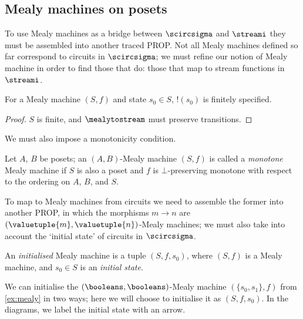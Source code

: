\documentclass{lmcs}
\begin{document}
\subsection{Mealy machines on posets}

To use Mealy machines as a bridge between \(\scircsigma\) and \(\streami\) they
must be assembled into another traced PROP.
Not all Mealy machines defined so far correspond to circuits in
\(\scircsigma\); we must refine our notion of Mealy machine in order to find
those that do: those that map to stream functions in \(\streami\).

\begin{lem}
    For a Mealy machine \((S, f)\) and state \(s_0 \in S\), \(!(s_0)\)
    is finitely specified.
\end{lem}
\begin{proof}
    \(S\) is finite, and \(\mealytostream\) must preserve transitions.
\end{proof}

We must also impose a monotonicity condition.

\begin{defi}
    Let \(A\), \(B\) be posets; an \((A,B)\)-Mealy machine \((S, f)\)
    is called a \emph{monotone} Mealy machine if \(S\) is also a poset and
    \(f\) is \(\bot\)-preserving monotone with respect to the ordering on
    \(A\), \(B\), and \(S\).
\end{defi}

To map to Mealy machines from circuits we need to assemble the former into
another PROP, in which the morphisms \(m \to n\) are
\((\valuetuple{m},\valuetuple{n})\)-Mealy machines; we must also take into
account the `initial state' of circuits in \(\scircsigma\).

\begin{defi}
    An \emph{initialised} Mealy machine is a tuple \((S, f, s_0)\), where
    \((S, f)\) is a Mealy machine, and \(s_0 \in S\) is an \emph{initial state}.
\end{defi}

\begin{exa}\label{ex:mealy-init}
    We can initialise the \((\booleans,\booleans)\)-Mealy machine
    \((\{s_0,s_1\},f)\) from \autoref{ex:mealy} in two ways; here we will choose to
    initialise it as \((S,f,s_0)\).
    In the diagrams, we label the initial state with an arrow.
    \begin{center}
        
    \end{center}
\end{exa}
\end{document}
